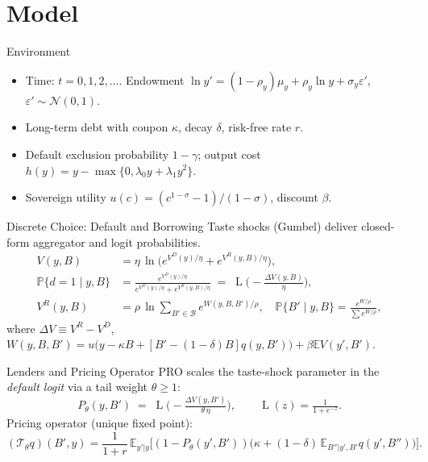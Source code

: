 \documentclass[aspectratio=169,11pt,professionalfonts]{beamer}
\newcommand{\E}{\mathbb{E}}
\newcommand{\bbP}{\mathbb{P}}
\newcommand{\1}{\mathbb{1}}
\DeclareMathOperator{\Lsig}{L}
\begin{document}
\section{Model}

\begin{frame}{Environment}
  \begin{itemize}
    \item Time: $t=0,1,2,\dots$. Endowment $\ln y'=(1-\rho_y)\mu_y+\rho_y\ln
            y+\sigma_y\varepsilon'$, $\varepsilon'\sim\mathcal N(0,1)$.
    \item Long-term debt with coupon $\kappa$, decay $\delta$, risk-free rate $r$.
    \item Default exclusion probability $1-\gamma$; output cost $h(y)=y-\max\{0,\lambda_0
            y+\lambda_1 y^2\}$.
    \item Sovereign utility $u(c)=(c^{1-\sigma}-1)/(1-\sigma)$, discount $\beta$.
  \end{itemize}
\end{frame}

\begin{frame}{Discrete Choice: Default and Borrowing}
  Taste shocks (Gumbel) deliver closed-form aggregator and logit probabilities.
  \begin{align*}
    V(y,B)                & = \eta\,\ln\!\Big( e^{V^D(y)/\eta}+e^{V^R(y,B)/\eta}\Big),                                                         \\
    \bbP\{d{=}1\mid y,B\} & =\frac{e^{V^D(y)/\eta}}{e^{V^D(y)/\eta}+e^{V^R(y,B)/\eta}}\;=\;\Lsig\!\Big(-\tfrac{\Delta V(y,B)}{\eta}\Big),      \\
    V^R(y,B)              & =\rho\,\ln\!\sum_{B'\in\mathcal B} e^{W(y,B,B')/\rho},\quad \bbP\{B'\mid y,B\}=\frac{e^{W/\rho}}{\sum e^{W/\rho}},
  \end{align*}
  where $\Delta V\equiv V^R{-}V^D$, $W(y,B,B')=u\big(y-\kappa B+[B'-(1{-}\delta)B]q(y,B')\big)+\beta\E V(y',B')$.
\end{frame}

\begin{frame}{Lenders and Pricing Operator}
  PRO scales the taste-shock parameter in the \emph{default logit} via a tail weight $\theta\ge1$:
  \begin{equation*}
    P_\theta(y,B')\;=\;\Lsig\!\Big(-\tfrac{\Delta V(y,B')}{\theta\,\eta}\Big),\qquad \Lsig(z)=\tfrac{1}{1+e^{-z}}.
  \end{equation*}
  Pricing operator (unique fixed point):
  \begin{equation*}
    (\mathcal T_\theta q)(B',y)=\frac{1}{1+r}\,\E_{y'|y}\!\Big[(1{-}P_\theta(y',B'))\big(\kappa+(1{-}\delta)\,\E_{B''|y',B'}q(y',B'')\big)\Big].
  \end{equation*}
\end{frame}
\end{document}
